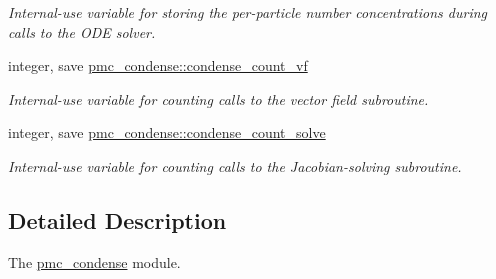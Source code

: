 \begin{DoxyCompactItemize}
\begin{DoxyCompactList}\small\item\em Internal-\/use variable for storing the per-\/particle number concentrations during calls to the O\+DE solver. \end{DoxyCompactList}\item 
integer, save \mbox{\hyperlink{namespacepmc__condense_af51c8e3d30352bcf05b09da63797f908}{pmc\+\_\+condense\+::condense\+\_\+count\+\_\+vf}}
\begin{DoxyCompactList}\small\item\em Internal-\/use variable for counting calls to the vector field subroutine. \end{DoxyCompactList}\item 
integer, save \mbox{\hyperlink{namespacepmc__condense_ab362439e7fd220994e7da1bd4658d21d}{pmc\+\_\+condense\+::condense\+\_\+count\+\_\+solve}}
\begin{DoxyCompactList}\small\item\em Internal-\/use variable for counting calls to the Jacobian-\/solving subroutine. \end{DoxyCompactList}\end{DoxyCompactItemize}


\subsection{Detailed Description}
The \mbox{\hyperlink{namespacepmc__condense}{pmc\+\_\+condense}} module. 

